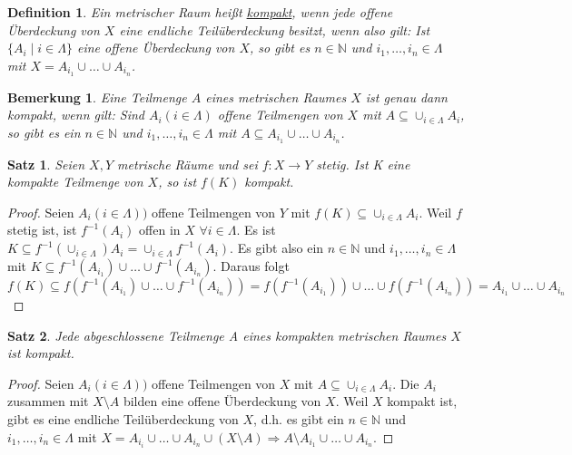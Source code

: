 \documentclass[10pt,a4paper]{report}
\newtheorem{satz}{Satz}
\newtheorem*{defi}{Definition}
\newtheorem*{remark}{Bemerkung}
\begin{document}
\begin{defi}
  Ein metrischer Raum heißt \underline{kompakt}, wenn jede offene Überdeckung von $X$ eine endliche Teilüberdeckung besitzt, wenn also gilt:
  Ist $\{ A_{i} \mid i \in \Lambda \}$ eine offene Überdeckung von $X$, so gibt es $n \in \mathbb{N}$ und $i_{1}, \dots, i_{n} \in \Lambda$ mit $X = A_{i_{1}} \cup \dots \cup A_{i_{n}}$.
\end{defi}

\begin{remark}
  Eine Teilmenge $A$ eines metrischen Raumes $X$ ist genau dann kompakt, wenn gilt:
  Sind $A_{i} (i \in \Lambda)$ offene Teilmengen von $X$ mit $A \subseteq \cup_{i \in \Lambda} A_{i}$, so gibt es ein $n \in \mathbb{N}$ und $i_{1}, \dots, i_{n} \in \Lambda$ mit $A \subseteq A_{i_{1}} \cup \dots \cup A_{i_{n}}$.
\end{remark}

\begin{satz}
  Seien $X, Y$ metrische Räume und sei $f : X \rightarrow Y$ stetig.
  Ist K eine kompakte Teilmenge von $X$, so ist $f(K)$ kompakt.
\end{satz}

\begin{proof}
  Seien $A_{i} (i \in \Lambda))$ offene Teilmengen von $Y$ mit $f(K) \subseteq \cup_{i \in \Lambda} A_{i}$.
  Weil $f$ stetig ist, ist $f^{-1}(A_{i})$ offen in $X$ $\forall i \in \Lambda$.
  Es ist $K \subseteq f^{-1}(\cup_{i \in \Lambda}) A_{i} = \cup_{i \in \Lambda} f^{-1}(A_{i})$.
  Es gibt also ein $n \in \mathbb{N}$ und $i_{1}, \dots, i_{n} \in \Lambda$ mit $K \subseteq f^{-1}(A_{i_{1}}) \cup \dots \cup f^{-1}(A_{i_{n}})$.
  Daraus folgt
  \begin{equation}
    f(K) \subseteq f(f^{-1}(A_{i_{1}}) \cup \dots \cup f^{-1}(A_{i_{n}})) = f(f^{-1}(A_{i_{1}})) \cup \dots \cup f(f^{-1}(A_{i_{n}})) = A_{i_{1}} \cup \dots \cup A_{i_{n}}
  \end{equation}
\end{proof}

\begin{satz}
  Jede abgeschlossene Teilmenge A eines kompakten metrischen Raumes $X$ ist kompakt.
\end{satz}

\begin{proof}
  Seien $A_{i} (i \in \Lambda))$ offene Teilmengen von $X$ mit $A \subseteq \cup_{i \in \Lambda} A_{i}$.
  Die $A_{i}$ zusammen mit $X \setminus A$ bilden eine offene Überdeckung von $X$.
  Weil $X$ kompakt ist, gibt es eine endliche Teilüberdeckung von $X$, d.h. es gibt ein $n \in \mathbb{N}$ und $i_{1}, \dots, i_{n} \in \Lambda$ mit $X = A_{i_{i}} \cup \dots \cup A_{i_{n}} \cup (X \setminus A) \Rightarrow A \setminus A_{i_{1}} \cup \dots \cup A_{i_{n}}$.
\end{proof}
\end{document}
